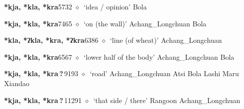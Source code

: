   \begin{list}{}{\leftmargin=1.5em \itemindent=-1.5em}
  \item {\footnotesize \textbf{*kja, *kla, *kra}}{\tiny 5732}
         $\diamond$~`idea / opinion'
         Bola 
  \item {\footnotesize \textbf{*kja, *kla, *kra}}{\tiny 7465}
\hspace{1ex}
         $\diamond$~`on (the wall)'
         Achang\_Longchuan 
\hspace{1ex}
         Bola 
  \item {\footnotesize \textbf{*kla, *ʔkla, *kra, *ʔkra}}{\tiny 6386}
\hspace{1ex}
         $\diamond$~`line (of wheat)'
         Achang\_Longchuan 
  \item {\footnotesize \textbf{*kja, *kla, *kra}}{\tiny 6567}
\hspace{1ex}
         $\diamond$~`lower half of the body'
         Achang\_Longchuan 
\hspace{1ex}
         Bola 
  \item {\footnotesize \textbf{*kja, *kla, *kra\,?\,}}{\tiny 9193}
\hspace{1ex}
         $\diamond$~`road'
         Achang\_Longchuan 
\hspace{1ex}
         Atsi 
\hspace{1ex}
         Bola 
\hspace{1ex}
         Lashi 
\hspace{1ex}
         Maru 
\hspace{1ex}
         Xiandao 
  \item {\footnotesize \textbf{*kja, *kla, *kra\,?\,}}{\tiny 11291}
\hspace{1ex}
         $\diamond$~`that side / there'
         Rangoon 
\hspace{1ex}
         Achang\_Longchuan 
\hspace{1ex}

\end{list}
